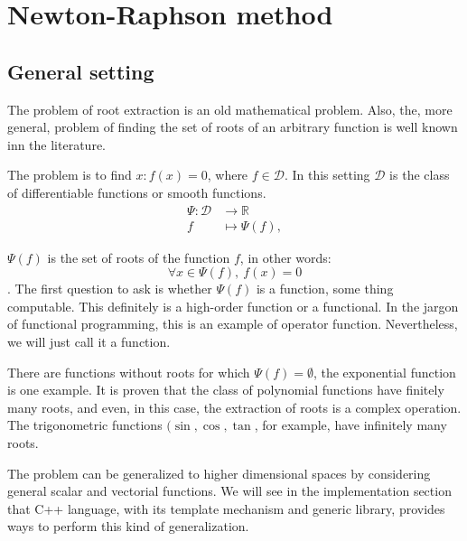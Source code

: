 \documentclass[12pt]{article}
\begin{document}
  
  \maketitle
  
  \section{Newton-Raphson method}
  	\subsection {General setting}
  		The problem of root extraction is an old mathematical problem.  
  		Also, the, more general, problem of finding the set of roots of an arbitrary function is well known inn the literature.  
   
  		The problem is to find \( x : f(x) =0\), where   \( f \in  \mathcal{D}\). In this setting \( \mathcal{D}\)  is the class of differentiable functions or smooth functions.
  			\begin{align} \label{eq:functionalPsi}
  				 \Psi \colon  \mathcal{D}   &\to \mathbb{R} \nonumber\\
  			 	f &\mapsto \Psi(f),
  			\end{align}
  
  		\(\Psi(f) \) is the set of roots of the function \( f \), in other words: \[ \forall  x \in \Psi(f),~f(x) =0\].
  		The first question to ask is whether \(\Psi(f) \) is a function, some thing computable. This definitely is a high-order function or a functional. 
  		In the jargon of functional programming, this is an example of operator function.  Nevertheless, we will just call it a function.  
  
  		There are functions without roots for which \( \Psi(f) = \emptyset \), the exponential function is one example.  
  		It is proven that the class of polynomial functions have finitely many roots, and even, in this case, the extraction of roots is a complex operation.
  		The trigonometric functions \((\sin, \cos,\tan\), for example, have infinitely many roots. 
  		
  		The problem can be generalized to higher dimensional spaces by considering general scalar and vectorial functions.  
  		We will see in the implementation section that C++ language, with its template mechanism and generic library, provides ways to perform this kind of generalization.
  
  
\end{document}
